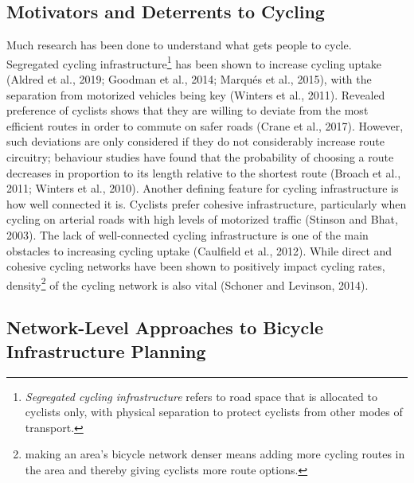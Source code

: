 \documentclass[
]{article}
\providecommand{\DIFaddbegin}{} %
\providecommand{\DIFaddend}{} %
\providecommand{\DIFdelbegin}{} %
\providecommand{\DIFdelend}{} %
\newcommand{\DIFscaledelfig}{0.5}
\newlength{\DIFdelgraphicswidth} %
\newlength{\DIFdelgraphicsheight} %
\newcommand{\DIFaddincludegraphics}[2][]{{\color{blue}\fbox{\DIFOincludegraphics[#1]{#2}}}} %
\newcommand{\DIFdelincludegraphics}[2][]{%
\sbox{\DIFdelgraphicsbox}{\DIFOincludegraphics[#1]{#2}}%
\settoboxwidth{\DIFdelgraphicswidth}{\DIFdelgraphicsbox} %
\settoboxtotalheight{\DIFdelgraphicsheight}{\DIFdelgraphicsbox} %
\scalebox{\DIFscaledelfig}{%
\parbox[b]{\DIFdelgraphicswidth}{\usebox{\DIFdelgraphicsbox}\\[-\baselineskip] \rule{\DIFdelgraphicswidth}{0em}}\llap{\resizebox{\DIFdelgraphicswidth}{\DIFdelgraphicsheight}{%
\setlength{\unitlength}{\DIFdelgraphicswidth}%
\begin{picture}(1,1)%
\thicklines\linethickness{2pt} %
{\color[rgb]{1,0,0}\put(0,0){\framebox(1,1){}}}%
{\color[rgb]{1,0,0}\put(0,0){\line( 1,1){1}}}%
{\color[rgb]{1,0,0}\put(0,1){\line(1,-1){1}}}%
\end{picture}%
}\hspace*{3pt}}} %
} %
\DeclareRobustCommand{\DIFaddbegin}{\DIFOaddbegin \let\includegraphics\DIFaddincludegraphics} %
\DeclareRobustCommand{\DIFaddend}{\DIFOaddend \let\includegraphics\DIFOincludegraphics} %
\DeclareRobustCommand{\DIFdelbegin}{\DIFOdelbegin \let\includegraphics\DIFdelincludegraphics} %
\DeclareRobustCommand{\DIFdelend}{\DIFOaddend \let\includegraphics\DIFOincludegraphics} %
\begin{document}
\hypertarget{motivators-and-deterrents-to-cycling}{%
\subsection{Motivators and Deterrents to Cycling}\label{motivators-and-deterrents-to-cycling}}

Much research has been done to understand what gets people to cycle.
Segregated cycling infrastructure\footnote{\emph{Segregated cycling infrastructure}
  refers to road space that is allocated to cyclists only, with physical
  separation to protect cyclists from other modes of transport.} has been
shown to increase cycling uptake (Aldred et al., 2019; Goodman et al., 2014; Marqués et al., 2015), with the separation from motorized
vehicles being key (Winters et al., 2011). Revealed preference of
cyclists shows that they are willing to deviate from the most efficient
routes in order to commute on safer roads (Crane et al., 2017).
However, such deviations are only considered if they do not considerably
increase route circuitry; behaviour studies have found that the
probability of choosing a route decreases in proportion to its length
relative to the shortest route (Broach et al., 2011; Winters et al., 2010).
Another defining feature for cycling infrastructure is how well
connected it is. Cyclists prefer cohesive infrastructure, particularly
when cycling on arterial roads with high levels of motorized traffic
(Stinson and Bhat, 2003). The lack of well-connected cycling
infrastructure is one of the main obstacles to increasing cycling uptake
(Caulfield et al., 2012). While direct and cohesive cycling networks
have been shown to positively impact cycling rates, density\footnote{making an
  area's bicycle network denser means adding more cycling routes in the
  area and thereby giving cyclists more route options.} of the cycling
network is also vital (Schoner and Levinson, 2014).

\DIFdelbegin %
\DIFdelend \DIFaddbegin \hypertarget{network-level-approaches-to-bicycle-infrastructure-planning}{%
\subsection{Network-Level Approaches to Bicycle Infrastructure Planning}\label{network-level-approaches-to-bicycle-infrastructure-planning}}
\DIFaddend 
\end{document}
